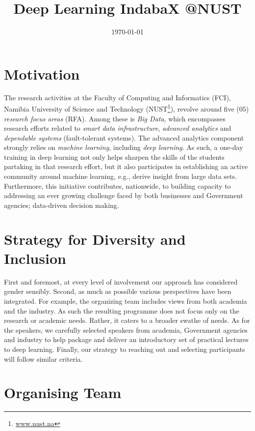\documentclass[10pt]{article}
\title{Deep Learning IndabaX @NUST}
\author{}
\date{\today}
\begin{document}
\maketitle


\section{Motivation}
\label{sec:motivation}

The research activities at the Faculty of Computing and Informatics (FCI), Namibia University of Science and Technology (NUST\footnote{\url{www.nust.na}}),
revolve around five ($05$) \emph{research focus areas} (RFA). Among these is \emph{Big Data}, which encompasses research efforts related to
\emph{smart data infrastructure}, \emph{advanced analytics} and \emph{dependable systems} (fault-tolerant systems). The advanced analytics component strongly
relies on \emph{machine learning}, including \emph{deep learning}. As such, a one-day training in deep learning not only helps sharpen the skills of the
students partaking in that research effort, but it also participates in establishing an active community around machine learning, e.g., derive
insight from large data sets. Furthermore, this initiative contributes, nationwide, to building capacity to addressing an ever growing
challenge faced by both businesses and Government agencies; data-driven decision making.

\section{Strategy for Diversity and Inclusion}
\label{sec:diversity-and-inclusion}

First and foremost, at every level of involvement our approach has considered gender sensibly. Second, as much as possible various perspectives have been
integrated. For example, the organizing team includes views from both academia and the industry. As such the resulting programme does not focus only on the
research or academic needs. Rather, it caters to a broader swathe of needs. As for the speakers, we carefully selected speakers from academia,
Government agencies and industry to help package and deliver an introductory set of practical lectures to deep learning. Finally, our strategy to reaching out
and selecting participants will follow similar criteria.

\section{Organising Team}
\label{sec:org-team}
\end{document}

